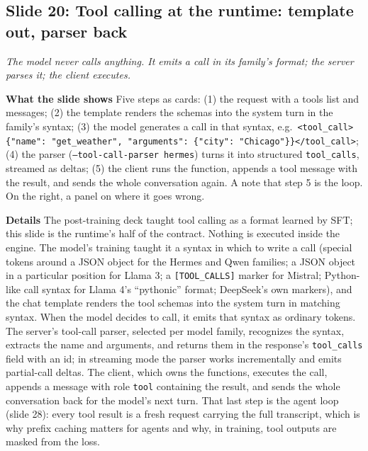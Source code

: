 \documentclass[11pt,letterpaper]{article}
\newcommand{\slide}[3]{%
  \subsection[Slide #1: #2]{Slide #1: #2}%
  {\color{muted}\itshape #3\par}\medskip}
\newcommand{\para}[1]{\medskip\noindent\textbf{#1}\quad}
\begin{document}
\slide{20}{Tool calling at the runtime: template out, parser back}{The model never calls anything. It emits a call in its family's format; the server parses it; the client executes.}

\para{What the slide shows} Five steps as cards: (1) the request with a tools list and messages; (2) the template renders the schemas into the system turn in the family's syntax; (3) the model generates a call in that syntax, e.g.\ \texttt{<tool\_call>\{"name": "get\_weather", "arguments": \{"city": "Chicago"\}\}</tool\_call>}; (4) the parser (\texttt{--tool-call-parser hermes}) turns it into structured \texttt{tool\_calls}, streamed as deltas; (5) the client runs the function, appends a tool message with the result, and sends the whole conversation again. A note that step 5 is the loop. On the right, a panel on where it goes wrong.

\para{Details} The post-training deck taught tool calling as a format learned by SFT; this slide is the runtime's half of the contract. Nothing is executed inside the engine. The model's training taught it a syntax in which to write a call (special tokens around a JSON object for the Hermes and Qwen families; a JSON object in a particular position for Llama 3; a \texttt{[TOOL\_CALLS]} marker for Mistral; Python-like call syntax for Llama 4's ``pythonic'' format; DeepSeek's own markers), and the chat template renders the tool schemas into the system turn in matching syntax. When the model decides to call, it emits that syntax as ordinary tokens. The server's tool-call parser, selected per model family, recognizes the syntax, extracts the name and arguments, and returns them in the response's \texttt{tool\_calls} field with an id; in streaming mode the parser works incrementally and emits partial-call deltas. The client, which owns the functions, executes the call, appends a message with role \texttt{tool} containing the result, and sends the whole conversation back for the model's next turn. That last step is the agent loop (slide 28): every tool result is a fresh request carrying the full transcript, which is why prefix caching matters for agents and why, in training, tool outputs are masked from the loss.
\end{document}
